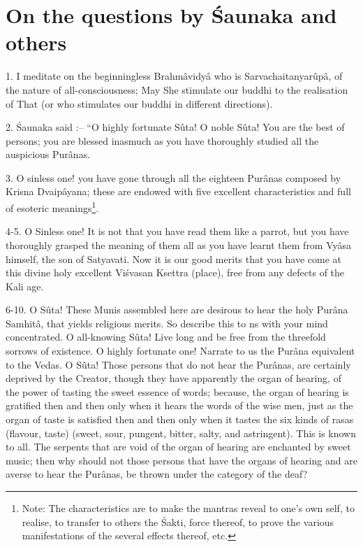 \chapter{On the questions by \'Saunaka and others}

1. I meditate on the beginningless Brahm\^avidy\^a who is Sarvachaitanyar\^up\^a, of the nature of all-consciousness;  May She stimulate our buddhi to the realisation of That (or who stimulates our buddhi in different directions).

2. \'Saunaka said :-- ``O highly fortunate S\^uta! O noble S\^uta! You are the best of persons; you are blessed inasmuch as you have thoroughly studied all the auspicious Pur\^anas.

3. O sinless one! you have gone through all the eighteen Pur\^anas composed by Krisna Dvaip\^ayana; these are endowed with five excellent characteristics and full of esoteric meanings\footnote{Note: The characteristics are to make the mantras reveal to one's own self, to realise, to transfer to others the \'Sakti, force thereof, to prove the various manifestations of the several effects thereof, etc.}.

4-5. O Sinless one! It is not that you have read them like a parrot, but you have thoroughly grasped the meaning of them all as you have learnt them from Vy\^asa himself, the son of Satyavati. Now it is our good merits that you have come at this divine holy excellent Vi\'svasan Ksettra (place), free from any defects of the Kali age.

6-10. O S\^uta! These Munis assembled here are desirous to hear the holy Pur\^ana Samhit\^a, that yields religious merits. So describe this to ns with your mind concentrated. O all-knowing S\^uta! Live long and be free from the threefold sorrows of existence. O highly fortunate one! Narrate to us the Pur\^ana equivalent to the Vedas. O S\^uta! Those persons that do  not hear the Pur\^anas, are certainly deprived by the Creator, though they have apparently the organ of hearing, of the power of tasting the sweet essence of words; because, the organ of hearing is gratified then and then only when it hears the words of the wise men, just as the organ of taste is satisfied then and then only when it tastes the six kinds of rasas (flavour, taste) (sweet, sour, pungent, bitter, salty, and astringent). This is known to all. The serpents that are void of the organ of hearing are enchanted by sweet music; then why should not those persons that have the organs of hearing and are averse to hear the Pur\^anas, be thrown under the category of the deaf? 

